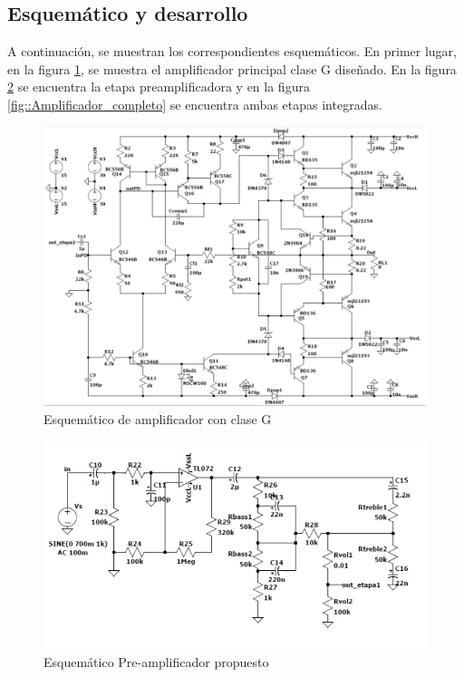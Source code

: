\subsection{Esquemático y desarrollo}

\par A continuación, se muestran los correspondientes esquemáticos. En primer lugar, en la figura \ref{fig::Amplificador_claseG}, se muestra el amplificador principal clase G diseñado. En la figura \ref{fig::Preamp} se encuentra la etapa preamplificadora y en la figura \ref{fig::Amplificador_completo} se encuentra ambas etapas integradas.

\begin{figure}[H]
        \centering
        \includegraphics[scale=0.6]{./Amplificador_claseG.PNG}
        \caption{Esquemático de amplificador con clase G}
        \label{fig::Amplificador_claseG}
\end{figure}

\begin{figure}[H]
        \centering
        \includegraphics[scale=0.8]{./Pre_amplificador.PNG}
        \caption{Esquemático Pre-amplificador propuesto}
        \label{fig::Preamp}
\end{figure}

